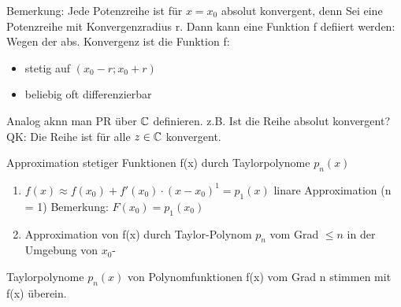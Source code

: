 \documentclass{../tudscript}
\begin{document}
        Bemerkung: Jede Potenzreihe ist für $x = x_0$ absolut konvergent, denn
        Sei
        eine Potenzreihe mit Konvergenzradius r.
        Dann kann eine Funktion f defiiert werden:
        Wegen der abs. Konvergenz ist die Funktion f:
        \begin{itemize}
            \item stetig auf $(x_0 - r; x_0 + r)$
            \item beliebig oft differenzierbar
        \end{itemize}
            Analog aknn man PR über $\mathbb{C}$ definieren.
            z.B.
            Ist die Reihe absolut konvergent?
            QK:
            Die Reihe ist für alle $z \in \mathbb{C}$ konvergent.
        
        Approximation stetiger Funktionen f(x) durch Taylorpolynome $p_n(x)$
        \begin{enumerate}
            \item $f(x) \approx f(x_0) + f'(x_0) \cdot (x-x_0)^1 = p_1(x)$
            linare Approximation (n = 1) 
            Bemerkung: $F(x_0) = p_1(x_0)$
            \item Approximation von f(x) durch Taylor-Polynom $p_n$ vom Grad $\leq n$ in der Umgebung von $x_0$-
        \end{enumerate}
        Taylorpolynome $p_n (x)$ von Polynomfunktionen f(x) vom Grad n stimmen mit f(x) überein. 
\end{document}
